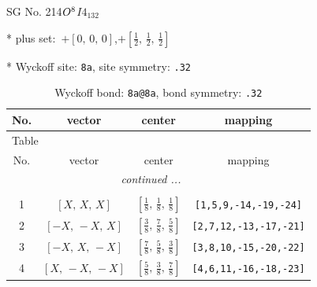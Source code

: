\documentclass[fleqn,8pt]{jsarticle}
\begin{document}
\setcounter{MaxMatrixCols}{32}

\renewcommand{\tablename}{Table~}
\renewcommand{\figurename}{Figure~}
\begin{center}
\LARGE
SG No. 214\quad$O_{\rm }^{8}$\quad$I4_132$\quad[ cubic ]
\end{center}

* plus set:\,\,\,$+\left[ 0,\, 0,\, 0 \right]$,\quad $+\left[ \frac{1}{2},\, \frac{1}{2},\, \frac{1}{2} \right]$


* Wyckoff site: {\tt 8a}, site symmetry: {\tt .32}
\renewcommand{\arraystretch}{1.2}
\begin{longtable}{cccc}
\caption{Wyckoff bond: {\tt 8a@8a}, bond symmetry: {\tt .32}}
 \\
 \hline \hline
No. & vector & center & mapping \\ \hline \endfirsthead

\multicolumn{3}{l}{\tablename\ \thetable{}} \\
 \hline \hline
No. & vector & center & mapping \\ \hline \endhead

 \hline \hline
\multicolumn{3}{r}{\footnotesize\it continued ...} \\ \endfoot

 \hline \hline
\multicolumn{3}{r}{} \\ \endlastfoot

1 & $\left[ X,\, X,\, X \right]$ & $\left[ \frac{1}{8},\, \frac{1}{8},\, \frac{1}{8} \right]$ & {\tt [1,5,9,-14,-19,-24]} \\ \hline
2 & $\left[ - X,\, - X,\, X \right]$ & $\left[ \frac{3}{8},\, \frac{7}{8},\, \frac{5}{8} \right]$ & {\tt [2,7,12,-13,-17,-21]} \\ \hline
3 & $\left[ - X,\, X,\, - X \right]$ & $\left[ \frac{7}{8},\, \frac{5}{8},\, \frac{3}{8} \right]$ & {\tt [3,8,10,-15,-20,-22]} \\ \hline
4 & $\left[ X,\, - X,\, - X \right]$ & $\left[ \frac{5}{8},\, \frac{3}{8},\, \frac{7}{8} \right]$ & {\tt [4,6,11,-16,-18,-23]} \\
\end{longtable}
\renewcommand{\arraystretch}{1.2}
\end{document}
